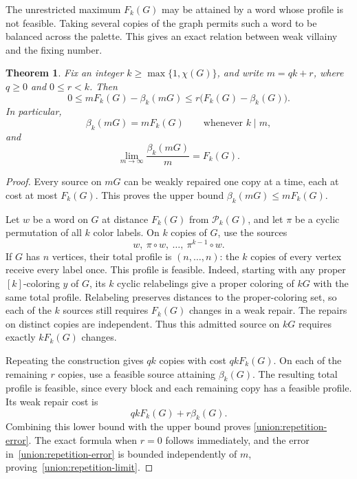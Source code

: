 \documentclass[10pt,a4paper]{amsart}
\numberwithin{equation}{section}
\newtheorem{theorem}{Theorem}[section]
\theoremstyle{definition}
\theoremstyle{remark}
\begin{document}
The unrestricted maximum $F_k(G)$ may be attained by a word whose
profile is not feasible.  Taking several copies of the graph permits
such a word to be balanced across the palette.  This gives an exact
relation between weak villainy and the fixing number.

\begin{theorem}\label{union:repetition-theorem}
Fix an integer $k\ge\max\{1,\chi(G)\}$, and write $m=qk+r$, where
$q\ge0$ and $0\le r<k$.  Then
\begin{equation}\label{union:repetition-error}
 0\le mF_k(G)-\beta_k(mG)
 \le r\bigl(F_k(G)-\beta_k(G)\bigr).
\end{equation}
In particular,
\begin{equation}\label{union:repetition-exact}
 \beta_k(mG)=mF_k(G)\qquad\text{whenever }k\mid m,
\end{equation}
and
\begin{equation}\label{union:repetition-limit}
 \lim_{m\to\infty}\frac{\beta_k(mG)}m=F_k(G).
\end{equation}
\end{theorem}


\begin{proof}
Every source on $mG$ can be weakly repaired one copy at a time, each
at cost at most $F_k(G)$.  This proves the upper bound
$\beta_k(mG)\le mF_k(G)$.

Let $w$ be a word on $G$ at distance $F_k(G)$ from
$\mathcal P_k(G)$, and let $\pi$ be a cyclic permutation of all $k$
color labels.  On $k$ copies of $G$, use the sources
\[
 w,\ \pi\circ w,\ \ldots,\ \pi^{k-1}\circ w.
\]
If $G$ has $n$ vertices, their total profile is
$(n,\ldots,n)$: the $k$ copies of every vertex receive every label
once.  This profile is feasible.  Indeed, starting with any proper
$[k]$-coloring $y$ of $G$, its $k$ cyclic relabelings give a proper coloring
of $kG$ with the same total profile.
Relabeling preserves distances to the proper-coloring set, so each
of the $k$ sources still requires $F_k(G)$ changes in a weak repair.
The repairs on distinct copies are independent.  Thus this admitted
source on $kG$ requires exactly $kF_k(G)$ changes.

Repeating the construction gives $qk$ copies with cost $qkF_k(G)$.
On each of the remaining $r$ copies, use a feasible source attaining
$\beta_k(G)$.  The resulting total profile is feasible, since
every block and each remaining copy has a feasible profile.
Its weak repair cost is
\[
 qkF_k(G)+r\beta_k(G).
\]
Combining this lower bound with the upper bound proves
\eqref{union:repetition-error}.  The exact formula when $r=0$ follows
immediately, and the error in~\eqref{union:repetition-error} is bounded
independently of $m$, proving~\eqref{union:repetition-limit}.
\end{proof}
\end{document}
